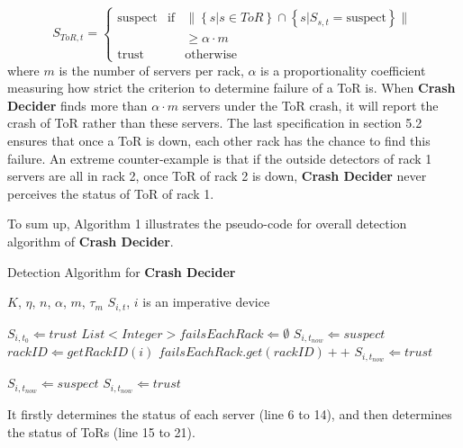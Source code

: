 \documentclass{sig-alternate-05-2015}
\begin{document}
\begin{equation}
S_{ToR,t}=\left\{
    \begin{array}{lcl}
    \text{suspect} & \text{if} & \|\left\{s|s\in ToR\right\} \cap \left\{s|S_{s,t}=\text{suspect}\right\}\| \\
    && \geq \alpha \cdot m\\
    \text{trust} && \text{otherwise}
    \end{array}
\right.
\end{equation}
where $m$ is the number of servers per rack, $\alpha$ is a  proportionality coefficient measuring how strict the criterion to determine failure of a ToR is. When \textbf{Crash Decider} finds more than $\alpha \cdot m$ servers under the ToR crash, it will report the crash of ToR rather than these servers. The last specification in section 5.2 ensures that once a ToR is down, each other rack has the chance to find this failure. An extreme counter-example is that if the outside detectors of rack 1 servers are all in rack 2, once ToR of rack 2 is down, \textbf{Crash Decider} never perceives the status of ToR of rack 1.

To sum up, Algorithm 1 illustrates the pseudo-code for overall detection algorithm of \textbf{Crash Decider}.

\renewcommand{\algorithmicrequire}{\textbf{Input:}}
\renewcommand{\algorithmicensure}{\textbf{Output:}}
\begin{algorithm}
	\caption{Detection Algorithm for \textbf{Crash Decider}}
	\begin{algorithmic}[1]
		\REQUIRE $K$, $\eta$, $n$, $\alpha$, $m$, $\tau_m$
		\ENSURE $S_{i,t}$, $i$ is an imperative device
	       
            \STATE $S_{i,t_0} \Leftarrow trust$
        \ENDFOR
            \STATE $List<Integer> failsEachRack \Leftarrow \emptyset$
                    \STATE $S_{i,t_{now}} \Leftarrow suspect$
                    \STATE $rackID \Leftarrow getRackID(i)$
                    \STATE $failsEachRack.get(rackID)++$
                \ELSE
                    \STATE $S_{i,t_{now}} \Leftarrow trust$
                \ENDIF
            \ENDFOR
            
                    \STATE $S_{i,t_{now}} \Leftarrow suspect$
                \ELSE
                    \STATE $S_{i,t_{now}} \Leftarrow trust$ 
                \ENDIF
            \ENDFOR
		\ENDWHILE
	\end{algorithmic}
\end{algorithm}
It firstly determines the status of each server (line 6 to 14), and then determines the status of ToRs (line 15 to 21).
\end{document}
